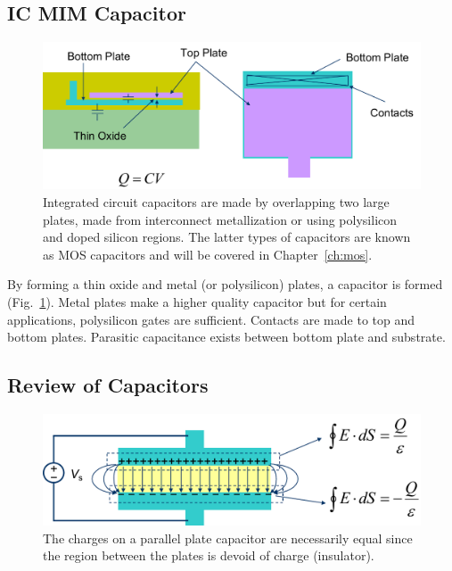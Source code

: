 \subsection{IC MIM Capacitor}

\begin{figure}[tb]
\begin{center}
\includegraphics[width=.75\columnwidth]{mod2-2_ICtech_sld_17}
\end{center}
\caption{Integrated circuit capacitors are made by overlapping two large plates, made from interconnect metallization or using polysilicon and doped silicon regions.  The latter types of capacitors are known as MOS capacitors and will be covered in Chapter~\ref{ch:mos}.} \label{fig:mod2-2_ICtech_sld_17}
\end{figure}

By forming a thin oxide and metal (or polysilicon) plates, a capacitor is formed (Fig.~\ref{fig:mod2-2_ICtech_sld_17}).  Metal plates make a higher quality capacitor but for certain applications, polysilicon gates are sufficient.   Contacts are made to top and bottom plates.   Parasitic capacitance exists between bottom plate and substrate.
 



\subsection{Review of Capacitors}


\begin{figure}[tbh]
\begin{center}
\includegraphics[width=.75\columnwidth]{mod2-2_ICtech_sld_18}
\end{center}
\caption{The charges on a parallel plate capacitor are necessarily equal since the region between the plates is devoid of charge (insulator).} \label{fig:mod2-2_ICtech_sld_18}
\end{figure}

